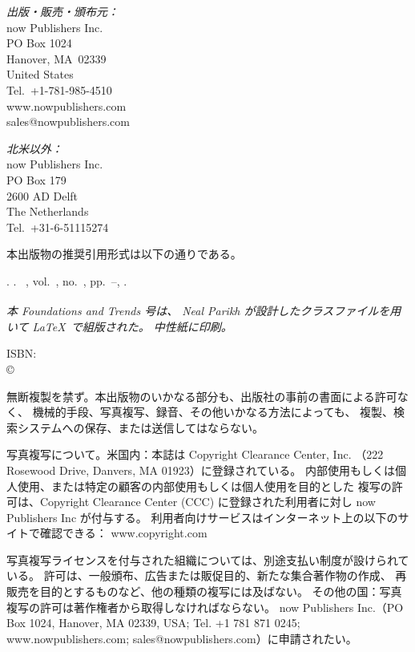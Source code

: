 {\begin{titlepage}
\parskip6pt
\footnotesize

\vfill

{\itshape 出版・販売・頒布元：}\\
now Publishers Inc.\\
PO Box 1024\\
Hanover, MA\ 02339\\
United States\\
Tel.\ +1-781-985-4510\\
www.nowpublishers.com\\
sales@nowpublishers.com

{\itshape 北米以外：}\\
now Publishers Inc.\\
PO Box 179\\
2600 AD Delft\\
The Netherlands\\
Tel.\ +31-6-51115274

本出版物の推奨引用形式は以下の通りである。

{\raggedright
\@copyrightowner. \emph{\@title}.  \@journaltitleprefix\
\@journaltitle, vol.~\@volume, no.~\@issue, pp.~\@firstpage--\@lastpage,
\@pubyear.\par}

{\itshape 本 Foundations and Trends\textsuperscript{\textregistered} 号は、
Neal Parikh が設計したクラスファイルを用いて \LaTeX\ で組版された。
中性紙に印刷。}

ISBN: \@isbn\\ \copyright\ \@copyrightyear\ \@copyrightowner

\vfill

\fontsize{8}{9}\selectfont
無断複製を禁ず。本出版物のいかなる部分も、出版社の事前の書面による許可なく、
機械的手段、写真複写、録音、その他いかなる方法によっても、
複製、検索システムへの保存、または送信してはならない。

写真複写について。米国内：本誌は Copyright Clearance Center, Inc.
（222 Rosewood Drive, Danvers, MA 01923）に登録されている。
内部使用もしくは個人使用、または特定の顧客の内部使用もしくは個人使用を目的とした
複写の許可は、Copyright Clearance Center (CCC) に登録された利用者に対し
now Publishers Inc が付与する。
利用者向けサービスはインターネット上の以下のサイトで確認できる：
www.copyright.com

写真複写ライセンスを付与された組織については、別途支払い制度が設けられている。
許可は、一般頒布、広告または販促目的、新たな集合著作物の作成、
再販売を目的とするものなど、他の種類の複写には及ばない。
その他の国：写真複写の許可は著作権者から取得しなければならない。
now Publishers Inc.（PO Box 1024, Hanover, MA
02339, USA; Tel. +1 781 871 0245; www.nowpublishers.com;
sales@nowpublishers.com）に申請されたい。


\end{titlepage}}

